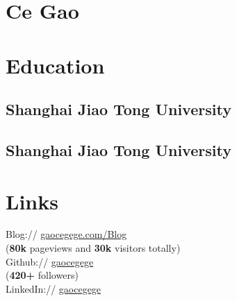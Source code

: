 \documentclass[]{deedy-resume-openfont}
\begin{document}
%
%
\lastupdated

%
%

\begin{minipage}[t]{0.25\textwidth}

\section{Ce Gao}


\section{Education}

\subsection{Shanghai Jiao Tong University}
\sectionsep

\subsection{Shanghai Jiao Tong University}
\sectionsep


\section{Links}
\sectionsep
Blog://  \href{http://gaocegege.com/Blog}{gaocegege.com/Blog} \\
(\textbf{80k} pageviews and \textbf{30k} visitors totally) \\
Github:// \href{https://github.com/gaocegege}{gaocegege} \\
(\textbf{420+} followers) \\
LinkedIn://  \href{https://www.linkedin.com/in/gaocegege}{gaocegege} \\


\end{minipage}
\end{document}
